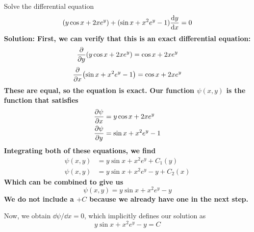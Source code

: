 \begin{example}
    Solve the differential equation
    \[ (y\cos x + 2xe^y) + (\sin x + x^2e^y-1)\dv{y}{x} = 0 \]
    \bf{Solution:} First, we can verify that this is an exact differential equation:
    \[ \pdv{y} (y\cos x + 2xe^y) = \cos x + 2xe^y \]
    \[ \pdv{x} (\sin x + x^2e^y - 1) = \cos x + 2xe^y \]
    These are equal, so the equation is exact. Our function $\psi(x,y)$ is the function that satisfies
    \begin{align*}
        \pdv{\psi}{x} &= y\cos x + 2xe^y \\
        \pdv{\psi}{y} &= \sin x + x^2e^y - 1
    \end{align*} 
    Integrating both of these equations, we find
    \begin{align*}
        \psi(x,y) &= y\sin x + x^2e^y + C_1(y) \\
        \psi(x,y) &= y\sin x + x^2e^y - y + C_2(x)
    \end{align*}
    Which can be combined to give us
    \[ \psi(x,y) = y\sin x + x^2e^y - y \]
    We do not include a $+C$ because we already have one in the next step. \par
    Now, we obtain $\dd \psi / \dd x = 0$, which implicitly defines our solution as
    \[ y\sin x + x^2e^y - y = C \]
\end{example}
